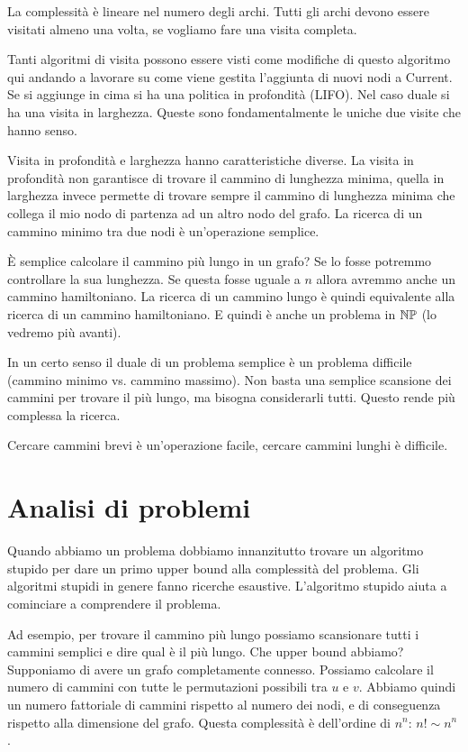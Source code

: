 La complessità è lineare nel numero degli archi. Tutti gli archi devono essere visitati almeno una
volta, se vogliamo fare una visita completa.

Tanti algoritmi di visita possono essere visti come modifiche di questo algoritmo qui andando a
lavorare su come viene gestita l'aggiunta di nuovi nodi a Current. Se si aggiunge in cima
si ha una politica in profondità (LIFO). Nel caso duale si ha una visita in larghezza. Queste sono
fondamentalmente le uniche due visite che hanno senso.

Visita in profondità e larghezza hanno caratteristiche diverse. La visita in profondità non
garantisce di trovare il cammino di lunghezza minima, quella in larghezza invece permette di trovare
sempre il cammino di lunghezza minima che collega il mio nodo di partenza ad un altro nodo del
grafo. La ricerca di un cammino minimo tra due nodi è un'operazione semplice.

È semplice calcolare il cammino più lungo in un grafo? Se lo fosse potremmo controllare la sua
lunghezza. Se questa fosse uguale a $n$ allora avremmo anche un cammino hamiltoniano. La ricerca di
un cammino lungo è quindi equivalente alla ricerca di un cammino hamiltoniano. E quindi è anche un
problema in $\mathbb{NP}$ (lo vedremo più avanti).

In un certo senso il duale di un problema semplice è un problema difficile (cammino minimo vs.
cammino massimo). Non basta una semplice scansione dei cammini per trovare il più lungo, ma bisogna
considerarli tutti. Questo rende più complessa la ricerca.

Cercare cammini brevi è un'operazione facile, cercare cammini lunghi è difficile.

\section{Analisi di problemi}

Quando abbiamo un problema dobbiamo innanzitutto trovare un algoritmo stupido per dare un primo
upper bound alla complessità del problema. Gli algoritmi stupidi in genere fanno ricerche
esaustive. L'algoritmo stupido aiuta a cominciare a comprendere il problema.

Ad esempio, per trovare il cammino più lungo possiamo scansionare tutti i cammini semplici e dire
qual è il più lungo. Che upper bound abbiamo? Supponiamo di avere un grafo completamente connesso.
Possiamo calcolare il numero di cammini con tutte le permutazioni possibili tra $u$ e $v$. Abbiamo
quindi un numero fattoriale di cammini rispetto al numero dei nodi, e di conseguenza rispetto alla
dimensione del grafo. Questa complessità è dell'ordine di $n^{n}$: $n! \sim n^{n}$. 

